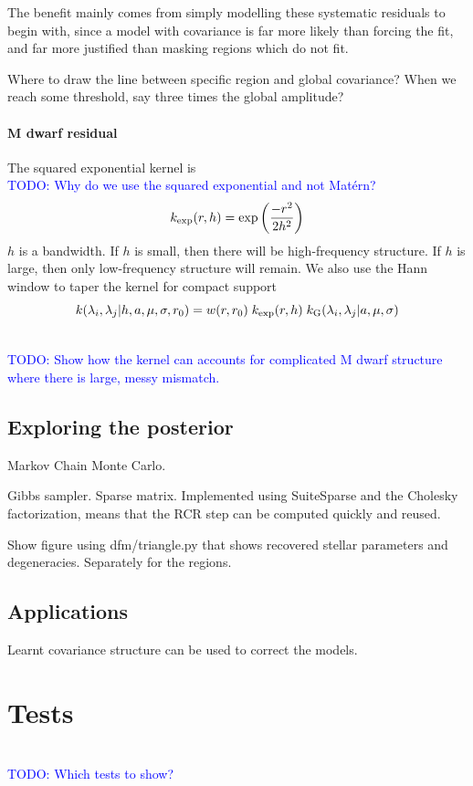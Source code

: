 \documentclass[preprint]{aastex} %
\newcommand{\matern}{Mat\'{e}rn}
\newcommand{\todo}[1]{ \textcolor{Blue}{\\TODO: #1}}
\begin{document}
The benefit mainly comes from simply modelling these systematic residuals to
 begin with, since a model with covariance is far more likely than forcing the
 fit, and far more justified than masking regions which do not fit.

Where to draw the line between specific region and global covariance? When we reach some threshold, say three times the global amplitude?

\paragraph{M dwarf residual}
The squared exponential kernel is
\todo{Why do we use the squared exponential and not \matern?}
\begin{equation}
  k_{ \rm exp}(r, h) = \exp \left ( \frac{- r^2 }{2 h^2} \right )
\end{equation}
$h$ is a bandwidth. 
If $h$ is small, then there will be high-frequency structure. If $h$ is large,
 then only low-frequency structure will remain. 
We also use the Hann window to taper the kernel for compact support
\begin{equation}
  k(\lambda_i, \lambda_j | h, a, \mu, \sigma, r_0) = 
   w(r, r_0)\; k_{ \rm exp}(r, h) \; 
   k_{\rm G}(\lambda_i, \lambda_j | a, \mu, \sigma)
\end{equation}

\todo{Show how the kernel can accounts for complicated M dwarf structure where
 there is large, messy mismatch.}


\subsection{Exploring the posterior}
\label{subsec:MCMC}
Markov Chain Monte Carlo.

Gibbs sampler.
Sparse matrix.
Implemented using SuiteSparse and the Cholesky factorization, means that the RCR step can be computed quickly and reused.

Show figure using dfm/triangle.py that shows recovered stellar parameters and degeneracies. Separately for the regions.

\subsection{Applications}
\label{subsec:learning}
Learnt covariance structure can be used to correct the models.

\section{Tests}
\todo{Which tests to show?}
\end{document}
